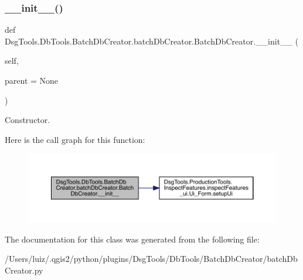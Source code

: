 \subsubsection{\texorpdfstring{\+\_\+\+\_\+init\+\_\+\+\_\+()}{\_\_init\_\_()}}
{\footnotesize\ttfamily def Dsg\+Tools.\+Db\+Tools.\+Batch\+Db\+Creator.\+batch\+Db\+Creator.\+Batch\+Db\+Creator.\+\_\+\+\_\+init\+\_\+\+\_\+ (\begin{DoxyParamCaption}\item[{}]{self,  }\item[{}]{parent = {\ttfamily None} }\end{DoxyParamCaption})}

\begin{DoxyVerb}Constructor.\end{DoxyVerb}
 Here is the call graph for this function\+:
\nopagebreak
\begin{figure}[H]
\begin{center}
\leavevmode
\includegraphics[width=350pt]{class_dsg_tools_1_1_db_tools_1_1_batch_db_creator_1_1batch_db_creator_1_1_batch_db_creator_a778e30418f8f86771a42c1a371c0dac2_cgraph}
\end{center}
\end{figure}


The documentation for this class was generated from the following file\+:\begin{DoxyCompactItemize}
\item 
/\+Users/luiz/.\+qgis2/python/plugins/\+Dsg\+Tools/\+Db\+Tools/\+Batch\+Db\+Creator/batch\+Db\+Creator.\+py\end{DoxyCompactItemize}
